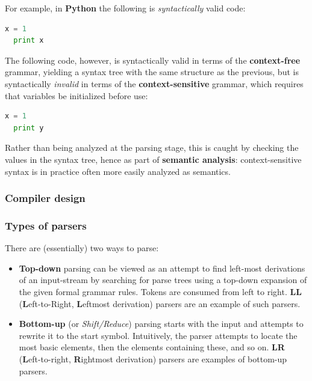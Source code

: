 \documentclass{beamer}
\begin{document}
\begin{frame}[fragile]
  For example, in \textbf{Python} the following is \textit{syntactically} valid
  code:

  \begin{lstlisting}[language=python]
  x = 1
  print x \end{lstlisting}

  The following code, however, is syntactically valid in terms of the
  \textbf{context-free} grammar, yielding a syntax tree with the same structure
  as the previous, but is syntactically \textit{invalid} in terms of the
  \textbf{context-sensitive} grammar, which requires that variables be
  initialized before use:

  \begin{lstlisting}[language=python]
  x = 1
  print y \end{lstlisting}

  Rather than being analyzed at the parsing stage, this is caught by checking
  the values in the syntax tree, hence as part of \textbf{semantic analysis}:
  context-sensitive syntax is in practice often more easily analyzed as
  semantics.
\end{frame}

\begin{frame}
  \frametitle{Compiler design}
  \begin{center}
  \end{center}
\end{frame}

\begin{frame}
  \frametitle{Types of parsers}
There are (essentially) two ways to parse:
\begin{itemize}
  \item \textbf{Top-down} parsing can be viewed as an attempt to find left-most
derivations of an input-stream by searching for parse trees using a top-down
expansion of the given formal grammar rules. Tokens are consumed from left to
right. \textbf{LL} (\textbf{L}eft-to-Right, \textbf{L}eftmost derivation)
parsers are an example of such parsers.

  \item \textbf{Bottom-up} (or \textit{Shift/Reduce}) parsing starts with the
input and attempts to rewrite it to the start symbol.  Intuitively, the parser
attempts to locate the most basic elements, then the elements containing these,
and so on. \textbf{LR} (\textbf{L}eft-to-right, \textbf{R}ightmost derivation)
parsers are examples of bottom-up parsers.
\end{itemize}
\end{frame}
\end{document}
